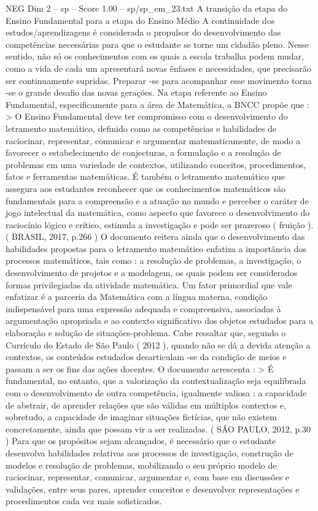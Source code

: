 \begin{textsample}{NEG Dim 2 – sp – Score 1.00 – sp/sp\_em\_23.txt}  \label{ex:f2_neg_089}
A transição da etapa do Ensino Fundamental para a etapa do Ensino Médio A continuidade dos estudos/aprendizagens é considerada o propulsor do desenvolvimento das competências necessárias para que o estudante se torne um cidadão pleno.
Nesse sentido, não só os conhecimentos com os quais a escola trabalha podem mudar, como a vida de cada um apresentará novas ênfases e necessidades, que precisarão ser continuamente supridas.
Preparar -se para acompanhar esse movimento torna -se o grande desafio das novas gerações.
Na etapa referente ao Ensino Fundamental, especificamente para a área de Matemática, a BNCC propõe que : > O Ensino Fundamental deve ter compromisso com o desenvolvimento do letramento matemático, definido como as competências e habilidades de raciocinar, representar, comunicar e argumentar matematicamente, de modo a favorecer o estabelecimento de conjecturas, a formulação e a resolução de problemas em uma variedade de contextos, utilizando conceitos, procedimentos, fatos e ferramentas matemáticas.
É também o letramento matemático que assegura aos estudantes reconhecer que os conhecimentos matemáticos são fundamentais para a compreensão e a atuação no mundo e perceber o caráter de jogo intelectual da matemática, como aspecto que favorece o desenvolvimento do raciocínio lógico e crítico, estimula a investigação e pode ser prazeroso ( fruição ). ( BRASIL, 2017, p.266 ) O documento reitera ainda que o desenvolvimento das habilidades propostas para o letramento matemático enfatiza a importância dos processos matemáticos, tais como : a resolução de problemas, a investigação, o desenvolvimento de projetos e a modelagem, os quais podem ser considerados formas privilegiadas da atividade matemática.
Um fator primordial que vale enfatizar é a parceria da Matemática com a língua materna, condição indispensável para uma expressão adequada e compreensiva, associadas à argumentação apropriada e ao contexto significativo dos objetos estudados para a elaboração e solução de situações-problema.
Cabe ressaltar que, segundo o Currículo do Estado de São Paulo ( 2012 ), quando não se dá a devida atenção a contextos, os conteúdos estudados desarticulam -se da condição de meios e passam a ser os fins das ações docentes.
O documento acrescenta : > É fundamental, no entanto, que a valorização da contextualização seja equilibrada com o desenvolvimento de outra competência, igualmente valiosa : a capacidade de abstrair, de aprender relações que são válidas em múltiplos contextos e, sobretudo, a capacidade de imaginar situações fictícias, que não existem concretamente, ainda que possam vir a ser realizadas. ( SÃO PAULO, 2012, p.30 ) Para que os propósitos sejam alcançados, é necessário que o estudante desenvolva habilidades relativas aos processos de investigação, construção de modelos e resolução de problemas, mobilizando o seu próprio modelo de raciocinar, representar, comunicar, argumentar e, com base em discussões e validações, entre seus pares, aprender conceitos e desenvolver representações e procedimentos cada vez mais sofisticados.

\end{textsample}
